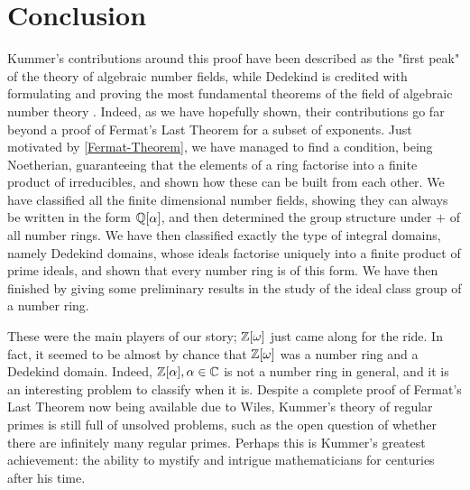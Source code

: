 \chapter{Conclusion}
Kummer's contributions around this proof have been described as the "first peak" \cite{History-algebraic} of the theory of algebraic number fields, while Dedekind is credited with formulating and proving the most fundamental theorems of the field of algebraic number theory \cite{History-algebraic}. Indeed, as we have hopefully shown, their contributions go far beyond a proof of Fermat's Last Theorem for a subset of exponents. Just motivated by \cref{Fermat-Theorem}, we have managed to find a condition, being Noetherian, guaranteeing that the elements of a ring factorise into a finite product of irreducibles, and shown how these can be built from each other. We have classified all the finite dimensional number fields, showing they can always be written in the form $\mathbb{Q}[\alpha]$, and then determined the group structure under $+$ of all number rings. We have then classified exactly the type of integral domains, namely Dedekind domains, whose ideals factorise uniquely into a finite product of prime ideals, and shown that every number ring is of this form. We have then finished by giving some preliminary results in the study of the ideal class group of a number ring.

These were the main players of our story; $\mathbb{Z}[\omega]$ just came along for the ride. In fact, it seemed to be almost by chance that $\mathbb{Z}[\omega]$ was a number ring and a Dedekind domain. Indeed, $\mathbb{Z}[\alpha],\alpha\in \mathbb{C}$ is not a number ring in general, and it is an interesting problem to classify when it is. Despite a complete proof of Fermat's Last Theorem now being available due to Wiles, Kummer's theory of regular primes is still full of unsolved problems, such as the open question of whether there are infinitely many regular primes. Perhaps this is Kummer's greatest achievement: the ability to mystify and intrigue mathematicians for centuries after his time.